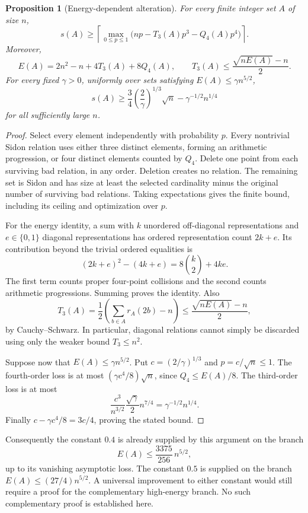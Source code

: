 \documentclass[11pt]{article}
\newtheorem{proposition}[theorem]{Proposition}
\theoremstyle{definition}
\theoremstyle{remark}
\newcommand{\ceil}[1]{\left\lceil #1\right\rceil}
\begin{document}
\begin{proposition}[Energy-dependent alteration]
\label{prop:energy-alteration}
For every finite integer set $A$ of size $n$,
\[
s(A)\ge\ceil{\max_{0\le p\le1}
\bigl(np-T_3(A)p^3-Q_4(A)p^4\bigr)}.
\]
Moreover,
\[
E(A)=2n^2-n+4T_3(A)+8Q_4(A),\qquad
T_3(A)\le\frac{\sqrt{nE(A)}-n}{2}.
\]
For every fixed $\gamma>0$, uniformly over sets satisfying
$E(A)\le\gamma n^{5/2}$,
\[
s(A)\ge
\frac34\left(\frac2\gamma\right)^{1/3}\sqrt n
-\gamma^{-1/2}n^{1/4}
\]
for all sufficiently large $n$.
\end{proposition}
\begin{proof}
Select every element independently with probability $p$. Every
nontrivial Sidon relation uses either three distinct elements, forming
an arithmetic progression, or four distinct elements counted by
$Q_4$. Delete one point from each surviving bad relation, in any
order. Deletion creates no relation. The remaining set is Sidon and
has size at least the selected cardinality minus the original number
of surviving bad relations. Taking expectations gives the finite
bound, including its ceiling and optimization over $p$.

For the energy identity, a sum with $k$ unordered off-diagonal
representations and $e\in\{0,1\}$ diagonal representations has
ordered representation count $2k+e$. Its contribution beyond the
trivial ordered equalities is
\[
(2k+e)^2-(4k+e)=8\binom k2+4ke.
\]
The first term counts proper four-point collisions and the second
counts arithmetic progressions. Summing proves the identity.
Also
\[
T_3(A)=\frac12\left(\sum_{b\in A}r_A(2b)-n\right)
\le\frac{\sqrt{nE(A)}-n}{2},
\]
by Cauchy--Schwarz. In particular, diagonal relations cannot simply be
discarded using only the weaker bound $T_3\le n^2$.

Suppose now that $E(A)\le\gamma n^{5/2}$. Put
$c=(2/\gamma)^{1/3}$ and $p=c/\sqrt n\le1$. The fourth-order loss is
at most $(\gamma c^4/8)\sqrt n$, since $Q_4\le E(A)/8$.
The third-order loss is at most
\[
\frac{c^3}{n^{3/2}}\frac{\sqrt\gamma}{2}n^{7/4}
=\gamma^{-1/2}n^{1/4}.
\]
Finally $c-\gamma c^4/8=3c/4$, proving the stated bound.
\end{proof}

Consequently the constant $0.4$ is already supplied by this argument
on the branch
\[
E(A)\le\frac{3375}{256}\,n^{5/2},
\]
up to its vanishing asymptotic loss. The constant $0.5$ is supplied on
the branch $E(A)\le(27/4)n^{5/2}$. A universal improvement to either
constant would still require a proof for the complementary high-energy
branch. No such complementary proof is established here.
\end{document}
